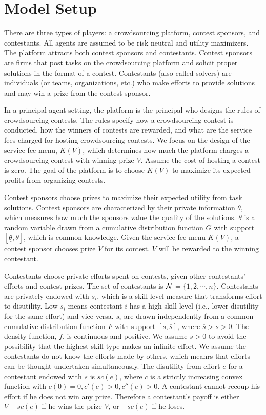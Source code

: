 \documentclass[12pt]{article}
\begin{document}
\section{Model Setup}

There are three types of players: a crowdsourcing platform, contest sponsors, and contestants.
All agents are assumed to be risk neutral and utility maximizers.
The platform attracts both contest sponsors and contestants. Contest sponsors are firms
that post tasks on the crowdsourcing platform and solicit proper solutions
in the format of a contest. Contestants (also called solvers) are individuals (or teams,
organizations, etc.) who make efforts to provide solutions and may
win a prize from the contest sponsor.

In a principal-agent setting, the platform is the principal who
designs the rules of crowdsourcing contests. The rules specify how
a crowdsourcing contest is conducted, how the winners of contests
are rewarded, and what are the service fees charged for hosting crowdsourcing
contests. We focus on the design of the service fee menu, $K(V)$,
which determines how much the platform charges a crowdsourcing
contest with winning prize $V$. Assume the cost of hosting a contest
is zero. The goal of the platform is to choose $K(V)$ to maximize
its expected profits from organizing contests.

Contest sponsors choose prizes to maximize their expected utility
from task solutions. Contest sponsors are characterized by their private
information $\theta$, which measures how much the sponsors value
the quality of the solutions. $\theta$ is a random variable drawn
from a cumulative distribution function $G$ with support $[\underline{\theta},\overline{\theta}]$,
which is common knowledge. Given the service fee menu $K(V)$, a contest
sponsor chooses prize $V$ for its contest. $V$ will be rewarded
to the winning contestant.

Contestants choose private efforts spent on contests, given other
contestants' efforts and contest prizes. The set of contestants is
${\cal N}$$=\{1,2,\cdots,n\}$. Contestants are privately endowed
with $s_{i}$, which is a skill level measure that transforms effort
to disutility. Low $s_{i}$ means contestant $i$ has a high skill
level (i.e., lower disutility for the same effort) and vice versa.
$s_{i}$ are drawn independently from a common cumulative distribution
function $F$ with support $[\underline{s},\overline{s}]$, where
$\overline{s}>\underline{s}>0$. The density function, $f$, is continuous
and positive. We assume $\underline{s}>0$ to avoid the possibility
that the highest skill type makes an infinite effort. We assume the
contestants do not know the efforts made by others, which meanrs that efforts can
be thought undertaken simultaneously. The disutility from effort $e$
for a contestant endowed with $s$ is $sc(e)$, where $c$ is a strictly
increasing convex function with $c(0)=0,c'(e)>0,c''(e)>0$. A contestant
cannot recoup his effort if he does not win any prize. Therefore a contestant's payoff is either $V-sc(e)$ if he wins the prize $V$,
or $-sc(e)$ if he loses.
\end{document}
